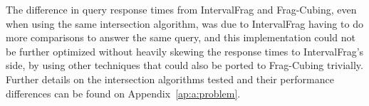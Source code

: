 The difference in query response times from IntervalFrag and Frag-Cubing, even when using the same intersection algorithm, was due to IntervalFrag having to do more comparisons to answer the same query, and this implementation could not be further optimized without heavily skewing the response times to IntervalFrag's side, by using other techniques that could also be ported to Frag-Cubing trivially.
Further details on the intersection algorithms tested and their performance differences can be found on Appendix~\ref{ap:a:problem}.

